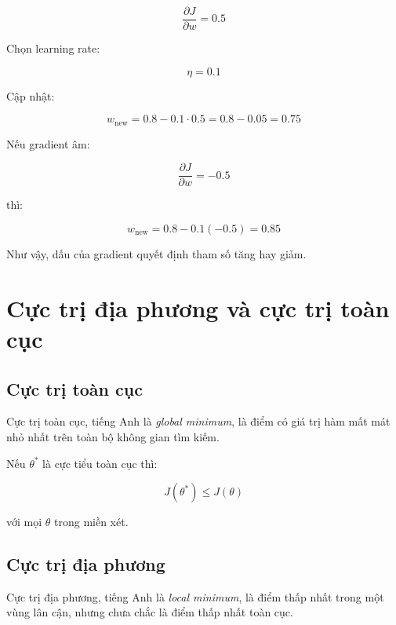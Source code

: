 \documentclass[12pt,a4paper]{report}
\begin{document}
\[
    \frac{\partial J}{\partial w}=0.5
\]

Chọn learning rate:

\[
    \eta=0.1
\]

Cập nhật:

\[
    w_{\text{new}}
    =
    0.8 - 0.1 \cdot 0.5
    =
    0.8 - 0.05
    =
    0.75
\]

Nếu gradient âm:

\[
    \frac{\partial J}{\partial w}=-0.5
\]

thì:

\[
    w_{\text{new}}
    =
    0.8 - 0.1(-0.5)
    =
    0.85
\]

Như vậy, dấu của gradient quyết định tham số tăng hay giảm.

\chapter{Cực trị địa phương và cực trị toàn cục}

\section{Cực trị toàn cục}

Cực trị toàn cục, tiếng Anh là \textit{global minimum}, là điểm có giá trị hàm mất mát nhỏ nhất trên toàn bộ không gian tìm kiếm.

Nếu $\theta^*$ là cực tiểu toàn cục thì:

\[
    J(\theta^*) \leq J(\theta)
\]

với mọi $\theta$ trong miền xét.

\section{Cực trị địa phương}

Cực trị địa phương, tiếng Anh là \textit{local minimum}, là điểm thấp nhất trong một vùng lân cận, nhưng chưa chắc là điểm thấp nhất toàn cục.

\begin{center}
\end{center}
\end{document}
